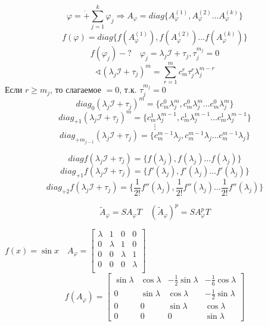 $$\varphi = \dot+ \sum_{j=1}^k \varphi_j \Rightarrow A_\varphi = diag \{A_\varphi^{(1)}, A_\varphi^{(2)}\ldots A_\varphi^{(k)}\}$$
$$f(\varphi)= diag \{f(A_\varphi^{(1)}), f(A_\varphi^{(2)})\ldots f(A_\varphi^{(k)})\}$$
$$f(\varphi_j)-? \quad \varphi_j = \lambda_j\mathcal I + \tau_j, \tau_j^{m_j}=0$$
$$\sphericalangle (\lambda_j\mathcal I + \tau_j)^m = \sum_{r=1}^m c_m^r \tau_j^r \lambda_j^{m-r}$$
Если $r\geq m_j$, то слагаемое $=0$, т.к. $\tau_j^{m_j}=0$
$$diag_0 (\lambda_j\mathcal I + \tau_j)^m = \{c_m^0\lambda_j^m, c_m^0\lambda_j^m \ldots c_m^0\lambda_j^m\}$$
$$diag_{+1} (\lambda_j\mathcal I + \tau_j)^m = \{c_m^1\lambda_j^{m-1}, c_m^1\lambda_j^{m-1} \ldots c_m^1\lambda_j^{m-1}\}$$
$$\vdots$$
$$diag_{+m_{j-1}} (\lambda_j\mathcal I + \tau_j) = \{c_m^{m-1}\lambda_j, c_m^{m-1}\lambda_j \ldots c_m^{m-1}\lambda_j\}$$
\begin{remark}
    $$diag f(\lambda_j\mathcal I + \tau_j) = \{f(\lambda_j), f(\lambda_j) \ldots f(\lambda_j)\}$$
    $$diag_{+1} f(\lambda_j\mathcal I + \tau_j) = \{f'(\lambda_j), f'(\lambda_j) \ldots f'(\lambda_j)\}$$
    $$diag_{+2} f(\lambda_j\mathcal I + \tau_j) = \{\frac{1}{2!}f''(\lambda_j), \frac{1}{2!}f''(\lambda_j) \ldots \frac{1}{2!}f''(\lambda_j)\}$$
\end{remark}
\begin{remark}
    $$\tilde A_\varphi = SA_\varphi T \quad (\tilde A_\varphi)^p = SA_\varphi^p T$$
\end{remark}

\begin{example}
    $f(x) = \sin x \quad A_\varphi=\begin{bmatrix}
        \lambda & 1 & 0 & 0 \\
        0 & \lambda & 1 & 0 \\
        0 & 0 & \lambda & 1 \\
        0 & 0 & 0 & \lambda \\
    \end{bmatrix}$
    $$f(A_\varphi) = \begin{bmatrix}
        \sin \lambda & \cos \lambda & -\frac{1}{2}\sin \lambda & -\frac{1}{6}\cos \lambda \\
        0 & \sin \lambda & \cos \lambda & -\frac{1}{2}\sin \lambda \\
        0 & 0 & \sin \lambda & \cos \lambda \\
        0 &0 & 0 & \sin \lambda
    \end{bmatrix}$$
\end{example}


